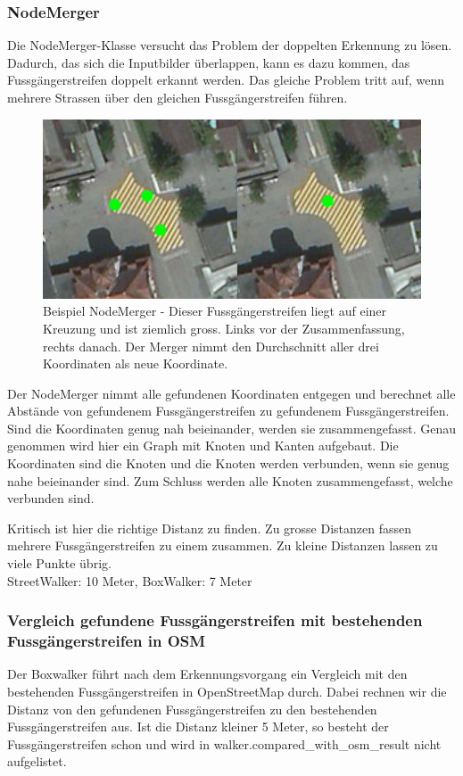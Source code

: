 \subsubsection{NodeMerger}
Die NodeMerger-Klasse versucht das Problem der doppelten Erkennung zu lösen. Dadurch, das sich die Inputbilder überlappen, kann es dazu kommen, das Fussgängerstreifen doppelt erkannt werden. Das gleiche Problem tritt auf, wenn mehrere Strassen über den gleichen Fussgängerstreifen führen.
\\
\begin{figure}[H]
	\centering
	\includegraphics{images/NodeMerger_Beispiel.png}
	\caption[Beispiele NodeMerger]{Beispiel NodeMerger - Dieser Fussgängerstreifen liegt auf einer Kreuzung und ist ziemlich gross. Links vor der Zusammenfassung, rechts danach. Der Merger nimmt den Durchschnitt aller drei Koordinaten als neue Koordinate.}
\end{figure}
\medskip

Der NodeMerger nimmt alle gefundenen Koordinaten entgegen und berechnet alle Abstände von gefundenem Fussgängerstreifen zu gefundenem Fussgängerstreifen. Sind die Koordinaten genug nah beieinander, werden sie zusammengefasst. Genau genommen wird hier ein Graph mit Knoten und Kanten aufgebaut. Die Koordinaten sind die Knoten und die Knoten werden verbunden, wenn sie genug nahe beieinander sind. Zum Schluss werden alle Knoten zusammengefasst, welche verbunden sind.

Kritisch ist hier die richtige Distanz zu finden. Zu grosse Distanzen fassen mehrere Fussgängerstreifen zu einem zusammen. Zu kleine Distanzen lassen zu viele Punkte übrig.
\\
 StreetWalker: 10 Meter, BoxWalker: 7 Meter

\subsubsection{Vergleich gefundene Fussgängerstreifen mit bestehenden Fussgängerstreifen in OSM}
Der Boxwalker führt nach dem Erkennungsvorgang ein Vergleich mit den bestehenden Fussgängerstreifen in OpenStreetMap durch. Dabei rechnen wir die Distanz von den gefundenen Fussgängerstreifen zu den bestehenden Fussgängerstreifen aus. Ist die Distanz kleiner 5 Meter, so besteht der Fussgängerstreifen schon und wird in walker.compared\_with\_osm\_result nicht aufgelistet.








